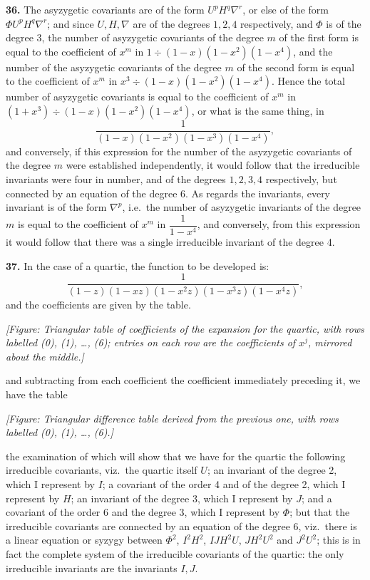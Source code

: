 \documentclass[11pt]{article}
\begin{document}
\textbf{36.} The asyzygetic covariants are of the form $U^p H^q \nabla^r$, or else of the form $\Phi U^p H^q \nabla^r$; and since $U, H, \nabla$ are of the degrees $1, 2, 4$ respectively, and $\Phi$ is of the degree 3, the number of asyzygetic covariants of the degree $m$ of the first form is equal to the coefficient of $x^m$ in $1 \div (1 - x)(1 - x^2)(1 - x^4)$, and the number of the asyzygetic covariants of the degree $m$ of the second form is equal to the coefficient of $x^m$ in $x^3 \div (1 - x)(1 - x^2)(1 - x^4)$. Hence the total number of asyzygetic covariants is equal to the coefficient of $x^m$ in $(1 + x^3) \div (1 - x)(1 - x^2)(1 - x^4)$, or what is the same thing, in
\[
\frac{1}{(1 - x)(1 - x^2)(1 - x^3)(1 - x^4)},
\]
and conversely, if this expression for the number of the asyzygetic covariants of the degree $m$ were established independently, it would follow that the irreducible invariants were four in number, and of the degrees $1, 2, 3, 4$ respectively, but connected by an equation of the degree 6. As regards the invariants, every invariant is of the form $\nabla^p$, i.e.\ the number of asyzygetic invariants of the degree $m$ is equal to the coefficient of $x^m$ in $\dfrac{1}{1 - x^4}$, and conversely, from this expression it would follow that there was a single irreducible invariant of the degree 4.

\textbf{37.} In the case of a quartic, the function to be developed is:
\[
\frac{1}{(1 - z)(1 - xz)(1 - x^2 z)(1 - x^3 z)(1 - x^4 z)},
\]
and the coefficients are given by the table.

\textit{[Figure: Triangular table of coefficients of the expansion for the quartic, with rows labelled (0), (1), \ldots, (6); entries on each row are the coefficients of $x^j$, mirrored about the middle.]}

and subtracting from each coefficient the coefficient immediately preceding it, we have the table

\textit{[Figure: Triangular difference table derived from the previous one, with rows labelled (0), (1), \ldots, (6).]}

the examination of which will show that we have for the quartic the following irreducible covariants, viz.\ the quartic itself $U$; an invariant of the degree 2, which I represent by $I$; a covariant of the order 4 and of the degree 2, which I represent by $H$; an invariant of the degree 3, which I represent by $J$; and a covariant of the order 6 and the degree 3, which I represent by $\Phi$; but that the irreducible covariants are connected by an equation of the degree 6, viz.\ there is a linear equation or syzygy between $\Phi^2$, $I^2 H^2$, $I J H^2 U$, $J H^2 U^2$ and $J^2 U^2$; this is in fact the complete system of the irreducible covariants of the quartic: the only irreducible invariants are the invariants $I, J$.
\end{document}
